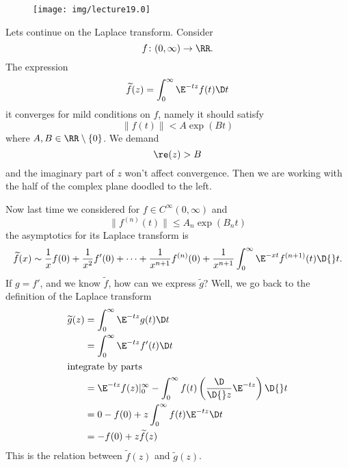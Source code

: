 
\begin{wrapfigure}{l}{0.9in}
\vspace{-24pt}
\begin{center}
\texttt{[image: img/lecture19.0]}
\end{center}
\end{wrapfigure}
\noindent{}Lets continue on the Laplace transform. Consider
\begin{equation}
f\colon(0,\infty)\to\RR.
\end{equation}
The expression 
\begin{equation}
\widetilde{f}(z)=\int^{\infty}_{0}\E^{-tz}f(t)\D t
\end{equation}
it converges for mild conditions on $f$, namely it should
satisfy
\begin{equation}
\|f(t)\|<A\exp(Bt)
\end{equation}
where $A,B\in\RR\setminus\{0\}$. We demand
\begin{equation}
\re(z)>B
\end{equation}
and the imaginary part of $z$ won't affect convergence. Then we
are working with the half of the complex plane doodled to the left.

Now last time we considered for $f\in C^{\infty}(0,\infty)$ and
\begin{equation}
\|f^{(n)}(t)\|\leq A_{n}\exp(B_{n}t)
\end{equation}
the asymptotics for its Laplace transform is
\begin{equation}
\widetilde{f}(x)\asymptote\frac{1}{x}f(0)+\frac{1}{x^{2}}f'(0)+\dots+\frac{1}{x^{n+1}}f^{(n)}(0)+\frac{1}{x^{n+1}}\int^{\infty}_{0}\E^{-xt}f^{(n+1)}(t)\D{}t.
\end{equation}
If $g=f'$, and we know $\widetilde{f}$, how can we express
$\widetilde{g}$? Well, we go back to the definition of the
Laplace transform
\begin{subequations}
\begin{align}
\widetilde{g}(z) &= \int^{\infty}_{0}\E^{-tz}g(t)\D t\\
&=\int^{\infty}_{0}\E^{-tz}f'(t)\D t\\
\intertext{integrate by parts}
&=\E^{-tz}f(z)|^{\infty}_{0}-\int^{\infty}_{0}f(t)\left(\frac{\D}{\D{}z}\E^{-tz}\right)\D{}t\\
&=0-f(0)+z\int^{\infty}_{0}f(t)\E^{-tz}\D t\\
&=-f(0)+z\widetilde{f}(z)
\end{align}
\end{subequations}
This is the relation between $\widetilde{f}(z)$ and $\widetilde{g}(z)$.

